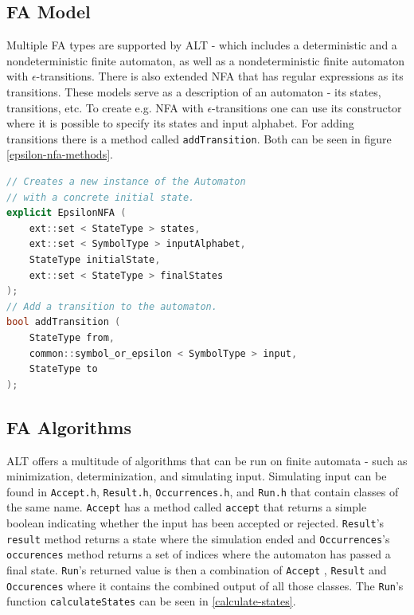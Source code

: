 \subsection{FA Model}

Multiple FA types are supported by ALT - which includes a deterministic and a nondeterministic finite automaton, as well as a nondeterministic finite automaton with $\epsilon$-transitions. There is also extended NFA that has regular expressions as its transitions. These models serve as a description of an automaton - its states, transitions, etc. To create e.g. NFA with $\epsilon$-transitions one can use its constructor where it is possible to specify its states and input alphabet. For adding transitions there is a method called \lstinline{addTransition}. Both can be seen in figure \ref{epsilon-nfa-methods}.

\begin{lstlisting}[language=C++, caption=EpsilonNFA example methods, label=epsilon-nfa-methods]
// Creates a new instance of the Automaton
// with a concrete initial state.
explicit EpsilonNFA ( 
    ext::set < StateType > states,
    ext::set < SymbolType > inputAlphabet, 
    StateType initialState, 
    ext::set < StateType > finalStates
);
// Add a transition to the automaton.
bool addTransition ( 
    StateType from,
    common::symbol_or_epsilon < SymbolType > input,
    StateType to 
);
\end{lstlisting}

\subsection{FA Algorithms}

ALT offers a multitude of algorithms that can be run on finite automata - such as minimization, determinization, and simulating input. Simulating input can be found in \lstinline{Accept.h}, \lstinline{Result.h}, \lstinline{Occurrences.h}, and \lstinline{Run.h} that contain classes of the same name. \lstinline{Accept} has a method called \lstinline{accept} that returns a simple boolean indicating whether the input has been accepted or rejected. \lstinline{Result}'s \lstinline{result} method returns a state where the simulation ended and \lstinline{Occurrences}'s \lstinline{occurences} method returns a set of indices where the automaton has passed a final state. \lstinline{Run}'s returned value is then a combination of \lstinline{Accept} , \lstinline{Result} and \lstinline{Occurences} where it contains the combined output of all those classes. The \lstinline{Run}'s function \lstinline{calculateStates} can be seen in \ref{calculate-states}.

